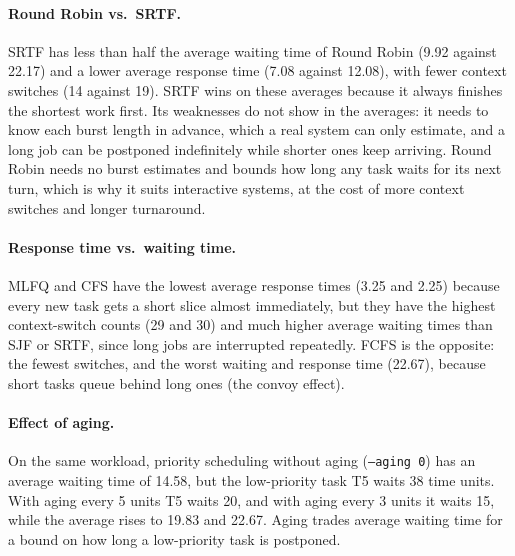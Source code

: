 \documentclass[11pt]{article}
\begin{document}
\paragraph{Round Robin vs.\ SRTF.} SRTF has less than half the average waiting time of
Round Robin (9.92 against 22.17) and a lower average response time (7.08 against 12.08),
with fewer context switches (14 against 19). SRTF wins on these averages because it always
finishes the shortest work first. Its weaknesses do not show in the averages: it needs to
know each burst length in advance, which a real system can only estimate, and a long job
can be postponed indefinitely while shorter ones keep arriving. Round Robin needs no
burst estimates and bounds how long any task waits for its next turn, which is why it suits
interactive systems, at the cost of more context switches and longer turnaround.

\paragraph{Response time vs.\ waiting time.} MLFQ and CFS have the lowest average response
times (3.25 and 2.25) because every new task gets a short slice almost immediately, but
they have the highest context-switch counts (29 and 30) and much higher average waiting
times than SJF or SRTF, since long jobs are interrupted repeatedly. FCFS is the opposite: the fewest
switches, and the worst waiting and response time (22.67), because short tasks queue behind
long ones (the convoy effect).

\paragraph{Effect of aging.} On the same workload, priority scheduling without aging
(\texttt{--aging 0}) has an average waiting time of 14.58, but the low-priority task T5
waits 38 time units. With aging every 5 units T5 waits 20, and with aging every 3 units it
waits 15, while the average rises to 19.83 and 22.67. Aging trades average waiting time for
a bound on how long a low-priority task is postponed.
\end{document}
